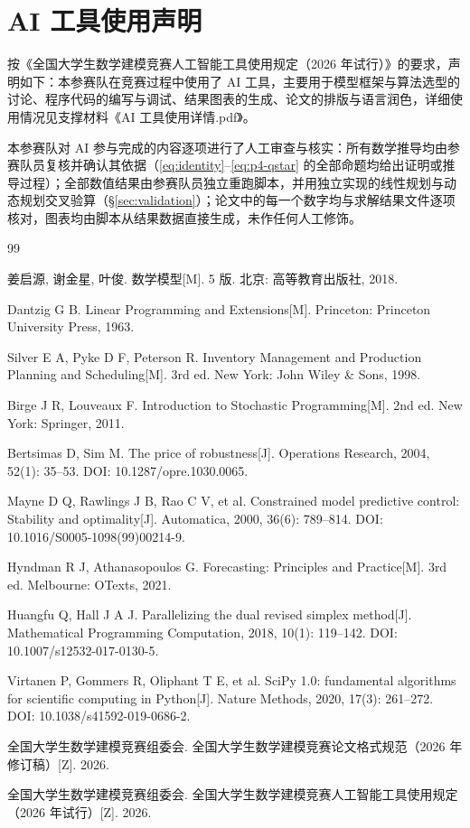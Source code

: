 \clearpage
\section*{AI 工具使用声明}
\label{sec:ai_declaration}

按《全国大学生数学建模竞赛人工智能工具使用规定（2026 年试行）》\cite{cumcm2026ai}的要求，声明如下：本参赛队在竞赛过程中使用了 AI 工具，主要用于模型框架与算法选型的讨论、程序代码的编写与调试、结果图表的生成、论文的排版与语言润色，详细使用情况见支撑材料《AI 工具使用详情.pdf》。

本参赛队对 AI 参与完成的内容逐项进行了人工审查与核实：所有数学推导均由参赛队员复核并确认其依据（\cref{eq:identity}--\cref{eq:p4-qstar} 的全部命题均给出证明或推导过程）；全部数值结果由参赛队员独立重跑脚本，并用独立实现的线性规划与动态规划交叉验算（\S\ref{sec:validation}）；论文中的每一个数字均与求解结果文件逐项核对，图表均由脚本从结果数据直接生成，未作任何人工修饰。

\clearpage
\label{sec:references}
\begin{thebibliography}{99}
\small

   姜启源, 谢金星, 叶俊. 数学模型[M]. 5 版. 北京: 高等教育出版社, 2018.

   Dantzig G B. Linear Programming and Extensions[M]. Princeton: Princeton University Press, 1963.

   Silver E A, Pyke D F, Peterson R. Inventory Management and Production Planning and Scheduling[M]. 3rd ed. New York: John Wiley \& Sons, 1998.

   Birge J R, Louveaux F. Introduction to Stochastic Programming[M]. 2nd ed. New York: Springer, 2011.

   Bertsimas D, Sim M. The price of robustness[J]. Operations Research, 2004, 52(1): 35--53. DOI: 10.1287/opre.1030.0065.

   Mayne D Q, Rawlings J B, Rao C V, et al. Constrained model predictive control: Stability and optimality[J]. Automatica, 2000, 36(6): 789--814. DOI: 10.1016/S0005-1098(99)00214-9.

   Hyndman R J, Athanasopoulos G. Forecasting: Principles and Practice[M]. 3rd ed. Melbourne: OTexts, 2021.

   Huangfu Q, Hall J A J. Parallelizing the dual revised simplex method[J]. Mathematical Programming Computation, 2018, 10(1): 119--142. DOI: 10.1007/s12532-017-0130-5.

   Virtanen P, Gommers R, Oliphant T E, et al. SciPy 1.0: fundamental algorithms for scientific computing in Python[J]. Nature Methods, 2020, 17(3): 261--272. DOI: 10.1038/s41592-019-0686-2.

   全国大学生数学建模竞赛组委会. 全国大学生数学建模竞赛论文格式规范（2026 年修订稿）[Z]. 2026.

   全国大学生数学建模竞赛组委会. 全国大学生数学建模竞赛人工智能工具使用规定（2026 年试行）[Z]. 2026.

\end{thebibliography}
